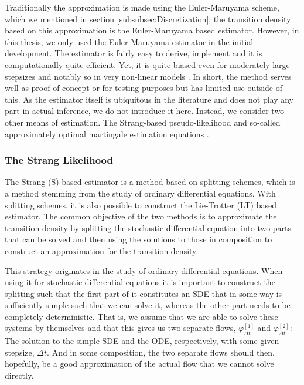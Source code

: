 Traditionally the approximation is made using the Euler-Maruyama scheme, which we mentioned in section \ref{subsubsec:Discretization}; the transition density based on this approximation is the Euler-Maruyama based estimator. However, in this thesis, we only used the Euler-Maruyama estimator in the initial development. The estimator is fairly easy to derive, implement and it is computationally quite efficient. Yet, it is quite biased even for moderately large stepsizes and notably so in very non-linear models \cite{SplittingSchemes}. In short, the method serves well as proof-of-concept or for testing purposes but has limited use outside of this. As the estimator itself is ubiquitous in the literature and does not play any part in actual inference, we do not introduce it here. Instead, we consider two other means of estimation. The Strang-based pseudo-likelihood \cite{SplittingSchemes} and so-called approximately optimal martingale estimation equations \cite{StatisticalMethodsForSDE}.
\subsubsection{The Strang Likelihood}
The Strang (S) based estimator is a method based on splitting schemes, which is a method stemming from the study of ordinary differential equations. With splitting schemes, it is also possible to construct the Lie-Trotter (LT) based estimator. The common objective of the two methods is to approximate the transition density by splitting the stochastic differential equation into two parts that can be solved and then using the solutions to those in composition to construct an approximation for the transition density.

This strategy originates in the study of ordinary differential equations. When using it for stochastic differential equations it is important to construct the splitting such that the first part of it constitutes an SDE that in some way is sufficiently simple such that we can solve it, whereas the other part needs to be completely deterministic. That is, we assume that we are able to solve these systems by themselves and that this gives us two separate flows, $\varphi_{\Delta t}^{[1]}$ and $\varphi_{\Delta t}^{[2]}$: The solution to the simple SDE and the ODE, respectively, with some given stepsize, $\Delta t$. And in some composition, the two separate flows should then, hopefully, be a good approximation of the actual flow that we cannot solve directly.


